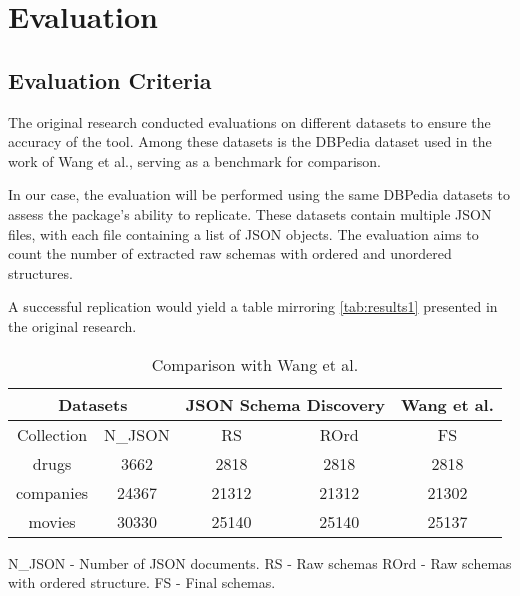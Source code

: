 \documentclass[sigconf, nonacm]{acmart}
\begin{document}
\section{Evaluation}

\subsection{Evaluation Criteria}

The original research conducted evaluations on different datasets to ensure the accuracy of the tool. Among these datasets is the DBPedia dataset used in the work of Wang et al.\cite{schemamanagement}, serving as a benchmark for comparison.

In our case, the evaluation will be performed using the same DBPedia datasets to assess the package’s ability to replicate. These datasets contain multiple JSON files, with each file containing a list of JSON objects. The evaluation aims to count the number of extracted raw schemas with ordered and unordered structures.

A successful replication would yield a table mirroring \autoref{tab:results1} presented in the original research.

\begin{table}[hb]%
	\centering
	\caption{Comparison with Wang et al.}
	\label{tab:results1}
	\begin{tabular}{|c|c|c|c|c|}
		\hline
		\multicolumn{2}{|c|}{Datasets} & \multicolumn{2}{c|}{JSON Schema Discovery} & Wang et al.                 \\
		\hline
		Collection                     & N\_JSON                                    & RS          & ROrd  & FS    \\
		\hline
		drugs                          & 3662                                       & 2818        & 2818  & 2818  \\
		\hline
		companies                      & 24367                                      & 21312       & 21312 & 21302 \\
		\hline
		movies                         & 30330                                      & 25140       & 25140 & 25137 \\
		\hline
	\end{tabular}
	\parbox{0.4\textwidth}{
		\raggedright\footnotesize
		N\_JSON - Number of JSON documents. RS - Raw schemas \newline
		ROrd - Raw schemas with ordered structure. FS - Final schemas.
	}
\end{table}
\end{document}
